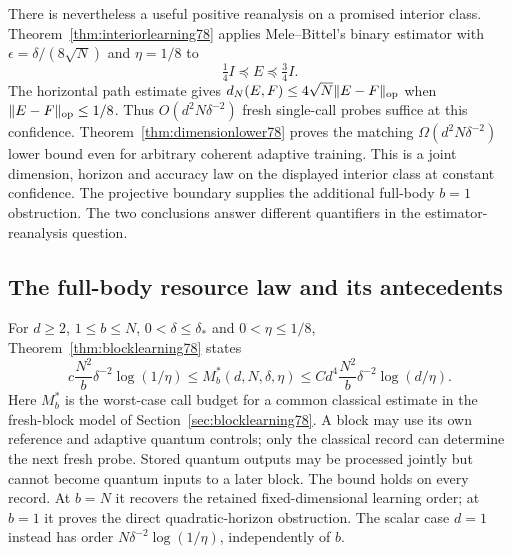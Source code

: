 There is nevertheless a useful positive reanalysis on a promised
interior class. Theorem~\ref{thm:interiorlearning78} applies
Mele--Bittel's binary estimator with
$\epsilon=\delta/(8\sqrt N)$ and $\eta=1/8$ to
\[
 \tfrac14 I\preceq E\preceq\tfrac34 I.
\]
The horizontal path estimate gives
$d_N(E,F)\le4\sqrt N\|E-F\|_{\rm op}$ when
$\|E-F\|_{\rm op}\le1/8$. Thus $O(d^2N\delta^{-2})$
fresh single-call probes suffice at this confidence.
Theorem~\ref{thm:dimensionlower78} proves the matching
$\Omega(d^2N\delta^{-2})$ lower bound even for arbitrary coherent
adaptive training. This is a joint dimension, horizon and accuracy
law on the displayed interior class at constant confidence.
The projective boundary supplies the additional full-body
$b=1$ obstruction. The two conclusions answer different
quantifiers in the estimator-reanalysis question.

\subsection{The full-body resource law and its antecedents}
For $d\ge2$, $1\le b\le N$, $0<\delta\le\delta_*$ and
$0<\eta\le1/8$, Theorem~\ref{thm:blocklearning78} states
\[
 c\frac{N^2}{b}\delta^{-2}\log(1/\eta)
 \le M_b^*(d,N,\delta,\eta)
 \le Cd^4\frac{N^2}{b}\delta^{-2}\log(d/\eta).
\]
Here $M_b^*$ is the worst-case call budget for a common classical
estimate in the fresh-block model of Section~\ref{sec:blocklearning78}.
A block may use its own reference and adaptive quantum controls;
only the classical record can determine the next fresh probe.
Stored quantum outputs may be processed jointly but cannot become
quantum inputs to a later block. The bound holds on every record.
At $b=N$ it recovers the retained fixed-dimensional learning order;
at $b=1$ it proves the direct quadratic-horizon obstruction.
The scalar case $d=1$ instead has order
$N\delta^{-2}\log(1/\eta)$, independently of $b$.

